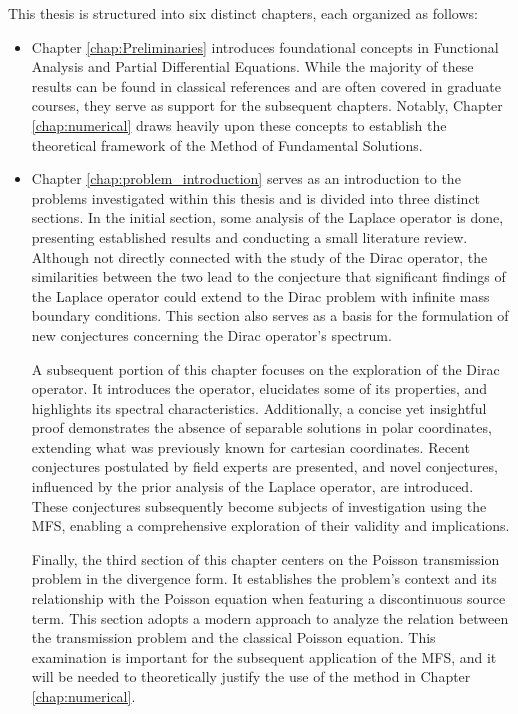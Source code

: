 This thesis is structured into six distinct chapters, each organized as follows:
\begin{itemize}
\item Chapter \ref{chap:Preliminaries} introduces foundational concepts in Functional Analysis and Partial Differential Equations. While the majority of these results can be found in classical references and are often covered in graduate courses, they serve as support for the subsequent chapters. Notably, Chapter \ref{chap:numerical} draws heavily upon these concepts to establish the theoretical framework of the Method of Fundamental Solutions.

\item Chapter \ref{chap:problem_introduction} serves as an introduction to the problems investigated within this thesis and is divided into three distinct sections. In the initial section, some analysis of the Laplace operator is done, presenting established results and conducting a small literature review. Although not directly connected with the study of the Dirac operator, the similarities between the two lead to the conjecture that significant findings of the Laplace operator could extend to the Dirac problem with infinite mass boundary conditions. This section also serves as a basis for the formulation of new conjectures concerning the Dirac operator's spectrum.

A subsequent portion of this chapter focuses on the exploration of the Dirac operator. It introduces the operator, elucidates some of its properties, and highlights its spectral characteristics. Additionally, a concise yet insightful proof demonstrates the absence of separable solutions in polar coordinates, extending what was previously known for cartesian coordinates. Recent conjectures postulated by field experts are presented, and novel conjectures, influenced by the prior analysis of the Laplace operator, are introduced. These conjectures subsequently become subjects of investigation using the \ac{MFS}, enabling a comprehensive exploration of their validity and implications.

Finally, the third section of this chapter centers on the Poisson transmission problem in the divergence form. It establishes the problem's context and its relationship with the Poisson equation when featuring a discontinuous source term. This section adopts a modern approach to analyze the relation between the transmission problem and the classical Poisson equation. This examination is important for the subsequent application of the \ac{MFS}, and it will be needed to theoretically justify the use of the method in Chapter \ref{chap:numerical}.


\end{itemize}
